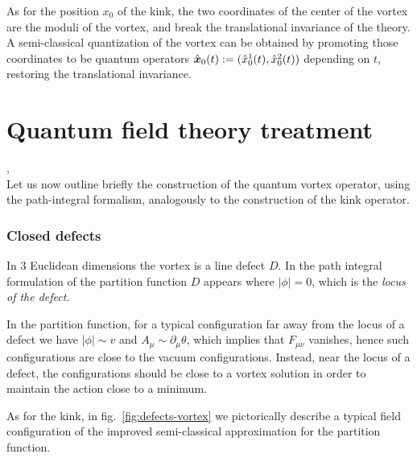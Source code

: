 \documentclass[../main/main.tex]{subfiles}
\begin{document}
As for the position $x_0$ of the kink, the two coordinates of the center of the vortex are the moduli of the vortex, and break the translational invariance of the theory. A semi-classical quantization of the vortex can be obtained by promoting those coordinates to be quantum operators $\hat{\boldsymbol x}_0(t):=(\hat{x}_0^1(t),\hat{x}_0^2(t))$ depending on $t$, restoring the translational invariance. 

\section{Quantum field theory treatment}

\cite{Frohlich:1988qh}, \cite{Frohlich:1987er}\\

Let us now outline briefly the construction of the quantum vortex operator, using the path-integral formalism, analogously to the construction of the kink operator.

\subsubsection{Closed defects}

In 3 Euclidean dimensions the vortex is a line defect $D$. In the path integral formulation of the partition function $D$ appears where $|\phi|=0$, which is the \emph{locus of the defect}. 

In the partition function, for a typical configuration far away from the locus of a defect we have $|\phi|\sim v$ and $A_\mu\sim\partial_\mu\theta$, which implies that $F_{\mu\nu}$ vanishes, hence such configurations are close to the vacuum configurations. 
Instead, near the locus of a defect, the configurations should be close to a vortex solution in order to maintain the action close to a minimum. 

As for the kink, in fig.~\ref{fig:defects-vortex} we pictorically describe a typical field configuration of the improved semi-classical approximation for the partition function. 
\end{document}
